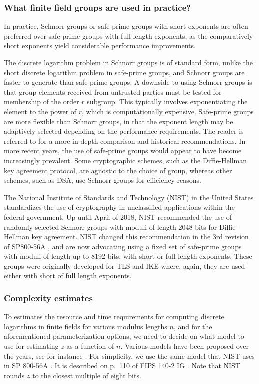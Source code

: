 \documentclass[a4paper, onecolumn, accepted=2021-03-29]{quantumarticle}
\begin{document}
\subsubsection{What finite field groups are used in practice?}
In practice, Schnorr groups or safe-prime groups with short exponents are often preferred over safe-prime groups with full length exponents, as the comparatively short exponents yield considerable performance improvements.

The discrete logarithm problem in Schnorr groups is of standard form, unlike the short discrete logarithm problem in safe-prime groups, and Schnorr groups are faster to generate than safe-prime groups. A downside to using Schnorr groups is that group elements received from untrusted parties must be tested for membership of the order $r$ subgroup. This typically involves exponentiating the element to the power of $r$, which is computationally expensive. Safe-prime groups are more flexible than Schnorr groups, in that the exponent length may be adaptively selected depending on the performance requirements. The reader is referred to \cite{oorschot} for a more in-depth comparison and historical recommendations. In more recent years, the use of safe-prime groups would appear to have become increasingly prevalent. Some cryptographic schemes, such as the Diffie-Hellman key agreement protocol, are agnostic to the choice of group, whereas other schemes, such as DSA, use Schnorr groups for efficiency reasons.

The National Institute of Standards and Technology (NIST) in the United States standardizes the use of crypto\-graphy in unclassified applications within the federal government. Up until April of 2018, NIST recommended the use of randomly selected Schnorr groups with moduli of length 2048 bits for Diffie-Hellman key agreement. NIST changed this recommendation in the 3rd revision of SP800-56A \cite{nist-sp-800-56-part1-rev3-2018}, and are now advocating using a fixed set of safe-prime groups with moduli of length up to 8192 bits, with short or full length exponents. These groups were originally developed for TLS \cite{rfc-tls} and IKE \cite{rfc-ike} where, again, they are used either with short of full length exponents.

\subsubsection{Complexity estimates}
To estimates the resource and time requirements for computing discrete logarithms in finite fields for various modulus lengths $n$, and for the aforementioned parameterization options, we need to decide on what model to use for estimating $z$ as a function of $n$. Various models have been proposed over the years, see for instance \cite{lenstra-verheul-model-2001, lenstra-model-2004, keylength2019}. For simplicity, we use the same model that NIST uses in SP 800-56A \cite{nist-sp-800-56-part1-rev3-2018}. It is described on p.~110 of FIPS 140-2 IG \cite{fips-140-2-IG}. Note that NIST rounds $z$ to the closest multiple of eight bits.
\end{document}
